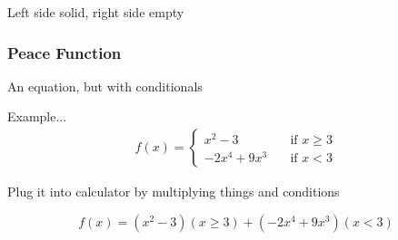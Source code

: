 \documentclass[twocolumn]{article}
\begin{document}
   	Left side solid, right side empty
   	
   	\subsubsection{Peace Function}
   	\par An equation, but with conditionals
   	
   	Example...
   	\begin{align*}
	   	f(x) = 
	   	\begin{cases}
	   		x^2 - 3      &\quad \text{if } x \ge 3 \\
	   		-2x^4 + 9x^3 &\quad \text{if } x < 3
	   	\end{cases}
   \end{align*}
 
 		Plug it into calculator by multiplying things and conditions
 		
 		\begin{equation*}
 			f(x) = (x^2 - 3)(x \ge 3) + (-2x^4 + 9x^3)(x < 3)
 		\end{equation*}
\end{document}
